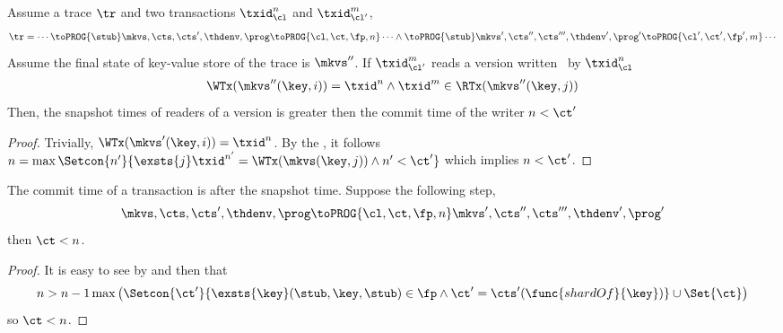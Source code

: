 \begin{lemma}
    \label{lem:clock-si-reader-greater-than-writer}
    Assume a trace \( \tr \) and two transactions \( \txid_{\cl}^n\) and \( \txid_{\cl'}^m \),
        \[
            \begin{array}{@{}l@{}}
                \tr = \cdots \toPROG{\stub} \mkvs,\cts,\cts',\thdenv, \prog \toPROG{\cl,\ct,\fp,n} \cdots \land
                \toPROG{\stub} \mkvs',\cts'',\cts''',\thdenv', \prog' \toPROG{\cl',\ct',\fp',m} \cdots
            \end{array}
        \]
    Assume the final state of key-value store of the trace is \( \mkvs'' \).
    If  \( \txid_{\cl'}^m \) reads a version written \ by \( \txid_{\cl}^n\)
    \[
        \begin{array}{@{}l@{}}
            \WTx(\mkvs''(\key,i)) = \txid^n 
            \land \txid^m \in \RTx(\mkvs''(\key,j))
        \end{array}
    \]
    Then, the snapshot times of readers of a version is greater then the commit time of the writer \( n < \ct' \)
\end{lemma}
\begin{proof}
    Trivially, \( \WTx(\mkvs'(\key,i)) = \txid^n \).
    By the , it follows \( n  = \max\Setcon{n'}{ \exsts{j} \txid^{n'} = \WTx(\mkvs(\key, j)) \land n' < \ct' } \) which implies \( n < \ct' \).
\end{proof}


\begin{lemma}
    \label{lem:commit-after-snapshot-time}
    The commit time of a transaction is after the snapshot time.
    Suppose the following step,
    \[
        \mkvs,\cts,\cts',\thdenv, \prog \toPROG{\cl,\ct,\fp,n} \mkvs',\cts'',\cts''',\thdenv', \prog'
    \]
    then \( \ct < n \).
\end{lemma}
\begin{proof}
    It is easy to see by  and then  that 
    \[
        n > n - 1 \max\left( \Setcon{\ct'}{\exsts{\key} (\stub, \key, \stub) \in \fp \land \ct' = \cts'(\func{shardOf}{\key})} \cup \Set{\ct} \right)
    \]
    so \( \ct < n \).
\end{proof}


